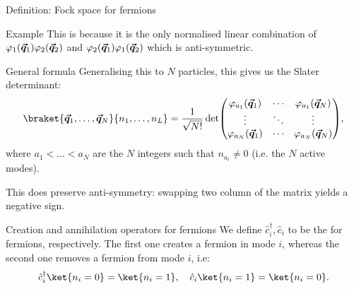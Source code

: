 \documentclass[a4paper]{article}
\begin{document}
\begin{parag}{Definition: Fock space for fermions}
\begin{subparag}{Example}
        This is because it is the only normalised linear combination of $\phi_1\left(\bvec{q}_1\right)\phi_2\left(\bvec{q}_2\right)$ and $\phi_2\left(\bvec{q}_1\right)\phi_1\left(\bvec{q}_2\right)$ which is anti-symmetric.
    \end{subparag}

    \begin{subparag}{General formula}
        Generalising this to $N$ particles, this gives us the Slater determinant: 
        \[\braket{\bvec{q}_1,\ldots,\bvec{q}_N}{n_1,\ldots,n_L} = \frac{1}{\sqrt{N!}} \det \begin{pmatrix} \phi_{a_1}\left(\bvec{q}_1\right) & \cdots & \phi_{a_1}\left(\bvec{q}_N\right) \\ \vdots & \ddots & \vdots \\ \phi_{a_N}\left(\bvec{q}_1\right) & \cdots & \phi_{a_N}\left(\bvec{q}_N\right) \end{pmatrix},\]
        where $a_1 < \ldots < a_N$ are the $N$ integers such that $n_{a_i} \neq 0$ (i.e. the $N$ active modes).

        This does preserve anti-symmetry: swapping two column of the matrix yields a negative sign.
    \end{subparag}
\end{parag}

\begin{parag}{Creation and annihilation operators for fermions}
    We define $\hat{c}_i^{\dagger}, \hat{c}_i$ to be the  for fermions, respectively. The first one creates a fermion in mode $i$, whereas the second one removes a fermion from mode $i$, i.e: 
    \[\hat{c}_i^{\dagger} \ket{n_i=0} = \ket{n_i=1}, \mathspace \hat{c}_i \ket{n_i=1} = \ket{n_i=0}.\]
\end{parag}
\end{document}

